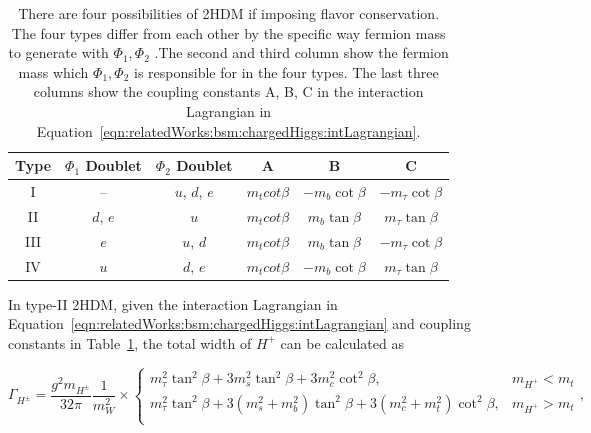 \begin{table}[ht]
    \centering
    \setlength{\tabcolsep}{1.2em}
    \renewcommand{\arraystretch}{1.2}
    \begin{tabular}{c|cc | ccc }
        \hline
        Type & $\Phi_1$ Doublet & $\Phi_2$ Doublet & A               & B                 & C                    \\
        \hline
        I    & --               & $u$, $d$, $e$    & $m_t cot \beta$ & $-m_b \cot \beta$ & $-m_\tau \cot \beta$ \\
        II   & $d$, $e$         & $u$              & $m_t cot \beta$ & $m_b \tan \beta$  & $m_\tau \tan \beta$  \\
        III  & $e$              & $u$, $d$         & $m_t cot \beta$ & $m_b \tan \beta$  & $-m_\tau \cot \beta$ \\
        IV   & $u$              & $d$, $e$         & $m_t cot \beta$ & $-m_b \cot \beta$ & $m_\tau \tan \beta$  \\
        \hline
    \end{tabular}
    \caption{ There are four possibilities of 2HDM if imposing flavor conservation. The four types differ from each other by the specific way fermion mass to generate with $\Phi_1,\Phi_2$ .The second and third column show the fermion mass which $\Phi_1,\Phi_2$ is responsible for in the four types. The last three columns show the coupling constants A, B, C in the interaction Lagrangian in Equation~\ref{eqn:relatedWorks:bsm:chargedHiggs:intLagrangian}.}
    \label{tab:relatedWorks:bsm:chargedHiggs:types}
\end{table}



In type-II 2HDM, given the interaction Lagrangian in Equation~\ref{eqn:relatedWorks:bsm:chargedHiggs:intLagrangian} and coupling constants in Table~\ref{tab:relatedWorks:bsm:chargedHiggs:types}, the total width of $H^+$ can be calculated as \cite{PhysRevD.99.095012}

\begin{equation}
    \Gamma_{H^\pm} = \frac{g^2 m_{H^\pm}}{32 \pi} \frac{1}{m^2_W} \times
    \begin{cases}
        m_\tau^2 \tan^2 \beta+ 3 m_s^2 \tan^2 \beta  + 3 m_c^2 \cot^2 \beta , & m_{H^+} < m_t \\
        m_\tau^2 \tan^2 \beta+ 3 (m_s^2+m_b^2) \tan^2 \beta  + 3 (m_c^2+m_t^2) \cot^2 \beta  , & m_{H^+} > m_t \\
    \end{cases}
    ,
\end{equation}

